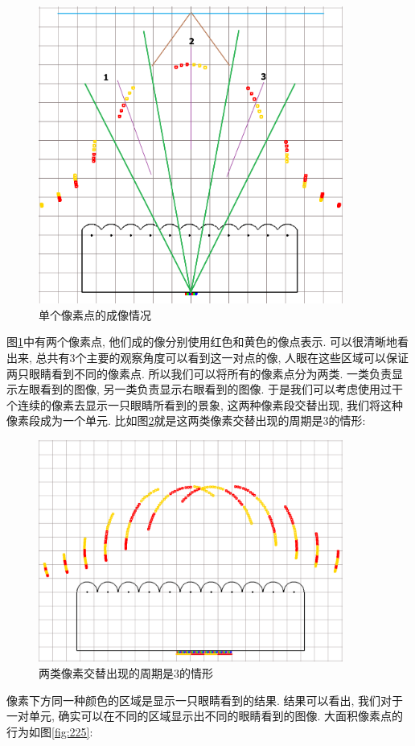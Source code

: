 \documentclass[a4paper, 11pt]{article}
\begin{document}
\begin{CJK}{UTF8}{gbsn}
\begin{figure}
  \centerline{\includegraphics[width=10cm]{217.png}}
  \caption{单个像素点的成像情况}
  \label{fig:217}
\end{figure}
图\ref{fig:217}中有两个像素点, 他们成的像分别使用红色和黄色的像点表示. 可以很清晰地看出来, 总共有3个主要的观察角度可以看到这一对点的像, 人眼在这些区域可以保证两只眼睛看到不同的像素点. 所以我们可以将所有的像素点分为两类. 一类负责显示左眼看到的图像, 另一类负责显示右眼看到的图像. 于是我们可以考虑使用过干个连续的像素去显示一只眼睛所看到的景象, 这两种像素段交替出现, 我们将这种像素段成为一个单元. 比如图\ref{fig:223}就是这两类像素交替出现的周期是3的情形:
\begin{figure}
  \centerline{\includegraphics[width=10cm]{223.png}}
  \caption{两类像素交替出现的周期是3的情形}
  \label{fig:223}
\end{figure}
像素下方同一种颜色的区域是显示一只眼睛看到的结果. 结果可以看出, 我们对于一对单元, 确实可以在不同的区域显示出不同的眼睛看到的图像. 大面积像素点的行为如图\ref{fig:225}:

\end{CJK}
\end{document}
